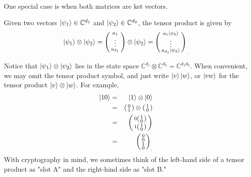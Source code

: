 \medskip

One special case is when both matrices are ket vectors. 

\begin{example}
Given two vectors $\ket{\psi_1}\in\mathbb{C}^{d_1}$ and $\ket{\psi_2}\in\mathbb{C}^{d_2}$, the tensor product is given by
\begin{equation}
\ket{\psi_1} \otimes\ket{\psi_2} = \left(\begin{smallmatrix} a_1\\ \vdots \\ a_{d_1}\end{smallmatrix}\right) \otimes \ket{\psi_2} = {\left(\begin{smallmatrix} a_1\ket{\psi_2}\\ \vdots \\a_{d_1}\ket{\psi_2}\end{smallmatrix}\right)}_.
\end{equation}
\end{example}
Notice that $\ket{\psi_1} \otimes\ket{\psi_2}$ lies in the state space $\mathbb{C}^{d_1}\otimes\mathbb{C}^{d_2}={\mathbb{C}}^{d_1 d_2}.$  When convenient, we may omit the tensor product symbol, and just write $\ket{v}\ket{w}$, or $\ket{vw}$ for the tensor product $\ket{v} \otimes \ket{w}$. For example, 
\begin{eqnarray*}
\ket{10}&=&\ket{1} \otimes \ket{0}\\
&=& \left(\begin{smallmatrix}0\\1\end{smallmatrix}\right) \otimes \left(\begin{smallmatrix}1\\0\end{smallmatrix}\right)\\ 
&=& \left(\begin{smallmatrix}
0\left(\begin{smallmatrix}1\\0\end{smallmatrix}\right)\\
1\left(\begin{smallmatrix}1\\0\end{smallmatrix}\right)\end{smallmatrix}\right)\\
&=&{\left(\begin{smallmatrix}
0\\
0\\
1\\
0\end{smallmatrix}\right)}_.
\end{eqnarray*}
With cryptography in mind, we sometimes think of the left-hand side of a tensor product as "slot A" and the right-hind side as "slot B."


